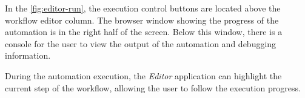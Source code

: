 In the \autoref{fig:editor-run}, the execution control buttons are located above the workflow editor column. 
The browser window showing the progress of the automation is in the right half of the screen.
Below this window, there is a console for the user to view the output of the automation and debugging information.

During the automation execution, the \textit{Editor} application can highlight the current step of the workflow, allowing the user to follow the execution progress.